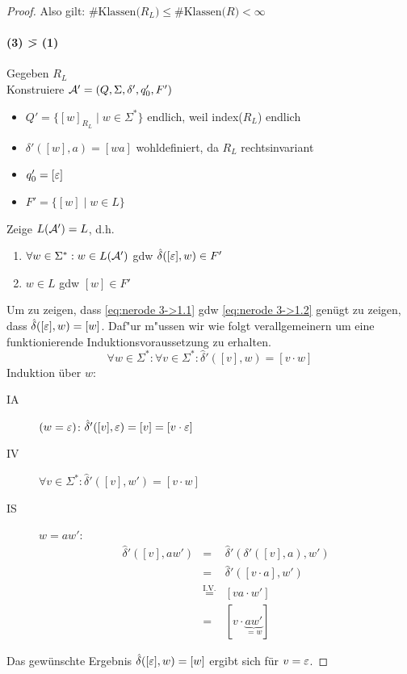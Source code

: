 \begin{proof}
Also gilt: $\text{\#Klassen($R_L$)$\leq$\#Klassen($R$)}<\infty$

\paragraph{(3) \=> (1)} Gegeben $R_L$\\
		Konstruiere $\mathcal{A}'=(Q,\Sigma,\delta',q_0',F')$
    \begin{itemize}
    \item $Q' = \{ [w]_{R_L} \mid w\in \Sigma^* \}$ \quad endlich, weil index($R_L$) endlich
    \item $\delta'([w],a) = [wa]$ wohldefiniert, da $R_L$ rechtsinvariant
    \item $q_0' = [\varepsilon]$
    \item $F' = \{ [w] \mid w\in L \}$
    \end{itemize}
    Zeige $L(\mathcal{A}')=L$, d.h.
    \begin{enumerate}
    \item \label{eq:nerode 3->1.1} $\forall w\in \Sigma^* : w\in L(\mathcal{A}')$ gdw $\hat\delta([\varepsilon],w)\in F'$
    \item \label{eq:nerode 3->1.2} $w\in L$ gdw $[w]\in F'$ 
    \end{enumerate}
    
    Um zu zeigen, dass \ref{eq:nerode 3->1.1} gdw \ref{eq:nerode 3->1.2} genügt zu zeigen, dass $\hat\delta([\varepsilon], w) = [w]$.
		Daf"ur m"ussen wir wie folgt verallgemeinern um eine funktionierende Induktionsvoraussetzung zu erhalten.
    \begin{displaymath}
      \forall w\in\Sigma^* :
			\forall v\in\Sigma^* : \hat\delta'([v],w) = [v\cdot w]
    \end{displaymath}
    Induktion über $w$:
    \begin{description}
    \item[IA] $(w = \varepsilon)$: $\hat\delta'([v],\varepsilon) = [v]=[v\cdot\varepsilon]$
    \item[IV] 
      $\forall v\in\Sigma^* : \hat\delta'([v],w') = [v\cdot w]$
    \item [IS] $w = aw'$:
      \begin{displaymath}
        \begin{array}{lcl}
        \hat\delta'([v],aw') &=& \hat\delta'(\delta'([v],a),w') \\
                             &=& \hat\delta'([v\cdot a],w') \\
                             &\stackrel{\text{I.V.}}{=}&[va\cdot w'] \\
                             &=& [v\cdot \underbrace{aw'}_{=w}]
        \end{array}
      \end{displaymath}
    \end{description}
		Das gewünschte Ergebnis $\hat\delta([\varepsilon], w) = [w]$ ergibt sich für $v=\varepsilon$. \qedhere
\end{proof}
